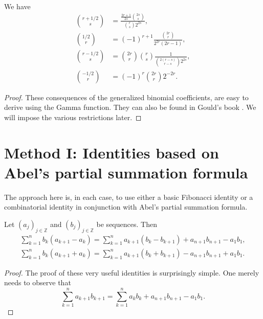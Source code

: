 \documentclass[12pt,reqno]{article}
\begin{document}
	\begin{lemma}\label{lem.binomial}
		We have
		\begin{align}
			\binom{{r + 1/2}}{s} &= \frac{{\frac{{2r + 1}}{{2s}}\binom{{2s}}{s}}}{{\binom{{r}}{s}2^{2s} }},\\
			\binom{{1/2}}{r} &= \left( { - 1} \right)^{r + 1} \frac{{\binom{{2r}}{r}}}{{2^{2r} \left( {2r - 1} \right)}},\\
			\binom{{r - 1/2}}{s} &= \binom{{2r}}{r}\binom{{r}}{s}\frac{1}{{\binom{{2\left( {r - s} \right)}}{{r - s}}2^{2s} }},\label{eq.qdgxupm}\\
			\binom{{ - 1/2}}{r} &= ( - 1)^r \binom{{2r}}{r}2^{ - 2r} .
		\end{align}
	\end{lemma}
	\begin{proof}
		These consequences of the generalized binomial coefficients, are easy to derive using the Gamma function. They can also be found in
		Gould's book \cite{Gould}. We will impose the various restrictions later.
	\end{proof}
	
	\section{Method I: Identities based on Abel's partial summation formula}
	
	The approach here is, in each case, to use either a basic Fibonacci identity or a combinatorial identity in conjunction with Abel's partial summation formula.
	\begin{lemma}
		Let ${(a_j)}_{j\in\mathbb Z}$ and ${(b_j)}_{j\in\mathbb Z}$ be sequences. Then
		\begin{gather}
			\sum_{k = 1}^n b_k (a_{k + 1} - a_k) = \sum_{k = 1}^n a_{k + 1} (b_k - b_{k + 1}) + a_{n + 1} b_{n + 1} - a_1 b_1, \label{abel1} \\
			\sum_{k = 1}^n b_k (a_{k + 1} + a_k) = \sum_{k = 1}^n a_{k + 1} (b_k + b_{k + 1}) - a_{n + 1} b_{n + 1} + a_1 b_1. \label{abel2}
		\end{gather}
	\end{lemma}
	\begin{proof}
		The proof of these very useful identities is surprisingly simple. One merely needs to observe that
		\begin{equation*}
			\sum_{k = 1}^n a_{k + 1} b_{k + 1} = \sum_{k = 1}^n a_k b_k + a_{n + 1} b_{n + 1} - a_1 b_1.
		\end{equation*}
	\end{proof}
	
\end{document}

